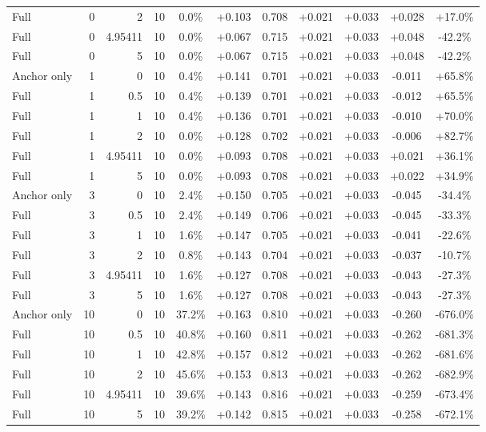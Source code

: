 \begin{table}[htbp]
\begin{tabular}{lrrrccccccc}
Full & 0 & 2 & 10 & 0.0\% & +0.103 & 0.708 & +0.021 & +0.033 & +0.028 & +17.0\% \\
Full & 0 & 4.95411 & 10 & 0.0\% & +0.067 & 0.715 & +0.021 & +0.033 & +0.048 & -42.2\% \\
Full & 0 & 5 & 10 & 0.0\% & +0.067 & 0.715 & +0.021 & +0.033 & +0.048 & -42.2\% \\
Anchor only & 1 & 0 & 10 & 0.4\% & +0.141 & 0.701 & +0.021 & +0.033 & -0.011 & +65.8\% \\
Full & 1 & 0.5 & 10 & 0.4\% & +0.139 & 0.701 & +0.021 & +0.033 & -0.012 & +65.5\% \\
Full & 1 & 1 & 10 & 0.4\% & +0.136 & 0.701 & +0.021 & +0.033 & -0.010 & +70.0\% \\
Full & 1 & 2 & 10 & 0.0\% & +0.128 & 0.702 & +0.021 & +0.033 & -0.006 & +82.7\% \\
Full & 1 & 4.95411 & 10 & 0.0\% & +0.093 & 0.708 & +0.021 & +0.033 & +0.021 & +36.1\% \\
Full & 1 & 5 & 10 & 0.0\% & +0.093 & 0.708 & +0.021 & +0.033 & +0.022 & +34.9\% \\
Anchor only & 3 & 0 & 10 & 2.4\% & +0.150 & 0.705 & +0.021 & +0.033 & -0.045 & -34.4\% \\
Full & 3 & 0.5 & 10 & 2.4\% & +0.149 & 0.706 & +0.021 & +0.033 & -0.045 & -33.3\% \\
Full & 3 & 1 & 10 & 1.6\% & +0.147 & 0.705 & +0.021 & +0.033 & -0.041 & -22.6\% \\
Full & 3 & 2 & 10 & 0.8\% & +0.143 & 0.704 & +0.021 & +0.033 & -0.037 & -10.7\% \\
Full & 3 & 4.95411 & 10 & 1.6\% & +0.127 & 0.708 & +0.021 & +0.033 & -0.043 & -27.3\% \\
Full & 3 & 5 & 10 & 1.6\% & +0.127 & 0.708 & +0.021 & +0.033 & -0.043 & -27.3\% \\
Anchor only & 10 & 0 & 10 & 37.2\% & +0.163 & 0.810 & +0.021 & +0.033 & -0.260 & -676.0\% \\
Full & 10 & 0.5 & 10 & 40.8\% & +0.160 & 0.811 & +0.021 & +0.033 & -0.262 & -681.3\% \\
Full & 10 & 1 & 10 & 42.8\% & +0.157 & 0.812 & +0.021 & +0.033 & -0.262 & -681.6\% \\
Full & 10 & 2 & 10 & 45.6\% & +0.153 & 0.813 & +0.021 & +0.033 & -0.262 & -682.9\% \\
Full & 10 & 4.95411 & 10 & 39.6\% & +0.143 & 0.816 & +0.021 & +0.033 & -0.259 & -673.4\% \\
Full & 10 & 5 & 10 & 39.2\% & +0.142 & 0.815 & +0.021 & +0.033 & -0.258 & -672.1\% \\

\end{tabular}
\end{table}

